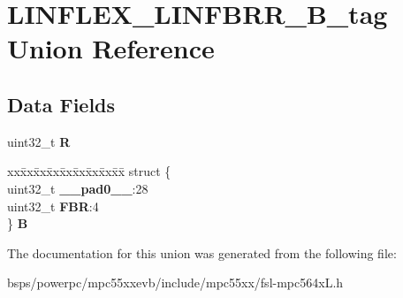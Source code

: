 \hypertarget{unionLINFLEX__LINFBRR__32B__tag}{}\section{L\+I\+N\+F\+L\+E\+X\+\_\+\+L\+I\+N\+F\+B\+R\+R\+\_\+B\+\_\+tag Union Reference}
\label{unionLINFLEX__LINFBRR__32B__tag}
\subsection*{Data Fields}
\begin{DoxyCompactItemize}
\item 
\mbox{\label{unionLINFLEX__LINFBRR__32B__tag_ad533d2c8e2e8e02a07000843af7f021a}} 
uint32\+\_\+t {\bfseries R}
\item 
\mbox{\label{unionLINFLEX__LINFBRR__32B__tag_a7b5af21a2ce44a3783d57b51f0a62811}} 
\begin{tabbing}
xx\=xx\=xx\=xx\=xx\=xx\=xx\=xx\=xx\=\kill
struct \{\\
\>uint32\_t {\bfseries \_\_pad0\_\_}:28\\
\>uint32\_t {\bfseries FBR}:4\\
\} {\bfseries B}\\

\end{tabbing}\end{DoxyCompactItemize}


The documentation for this union was generated from the following file\+:\begin{DoxyCompactItemize}
\item 
bsps/powerpc/mpc55xxevb/include/mpc55xx/fsl-\/mpc564x\+L.\+h\end{DoxyCompactItemize}
